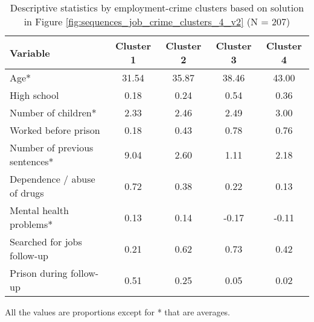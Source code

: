 \begin{table}[htp]
\footnotesize
\setlength{\tabcolsep}{10pt}
\renewcommand{\arraystretch}{1.3}
\begin{threeparttable}
\centering
\caption{Descriptive statistics by employment-crime clusters \newline based on solution in Figure \ref{fig:sequences_job_crime_clusters_4_v2} (N = 207)} 
\label{tab:descriptive_job_crime_clusters_4}
\begin{tabular}{lcccc}
  \hline
Variable & Cluster 1 & Cluster 2 & Cluster 3 & Cluster 4 \\ 
  \hline
Age* & 31.54 & 35.87 & 38.46 & 43.00 \\ 
  High school & 0.18 & 0.24 & 0.54 & 0.36 \\ 
  Number of children* & 2.33 & 2.46 & 2.49 & 3.00 \\ 
  Worked before prison & 0.18 & 0.43 & 0.78 & 0.76 \\ 
  Number of previous sentences* & 9.04 & 2.60 & 1.11 & 2.18 \\ 
  Dependence / abuse of drugs & 0.72 & 0.38 & 0.22 & 0.13 \\ 
  Mental health problems* & 0.13 & 0.14 & -0.17 & -0.11 \\ 
  Searched for jobs follow-up & 0.21 & 0.62 & 0.73 & 0.42 \\ 
  Prison during follow-up & 0.51 & 0.25 & 0.05 & 0.02 \\ 
   \hline
\end{tabular}
\begin{tablenotes}
\scriptsize
\item All the values are proportions except for * that are averages.
\end{tablenotes}
\end{threeparttable}
\end{table}
